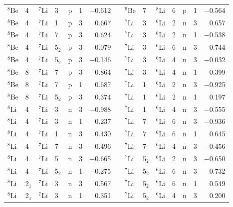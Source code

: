 \documentclass[10pt]{iopart}
\begin{document}
\begin{table}[tp]
\begin{tabular*}{\textwidth}{@{\extracolsep{\fill}}llllllrl@{\extracolsep{\fill}}llllllr@{\extracolsep{\fill}}}
$^8$Be  & 4  & ${}^7$Li   & 3   & p       & 1   & $-$0.612 &  & ${}^9$Be  & 7  & ${}^8$Li    & 6   & p       & 1   & $-$0.564  \\
$^8$Be  & 4  & ${}^7$Li   & 1   & p       & 3   & 0.667  &  & ${}^7$Li  & 3  & ${}^6$Li   & 2   & n       & 3   & 0.657   \\
$^8$Be  & 4  & ${}^7$Li   & 7   & p       & 3   & 0.624  &  & ${}^7$Li  & 3  & ${}^6$Li   & 2   & n       & 1   & $-$0.538  \\
$^8$Be  & 4  & ${}^7$Li   & 5$_2$   & p       & 3   & 0.079  &  & ${}^7$Li  & 3  & ${}^6$Li   & 6   & n       & 3   & 0.744   \\
$^8$Be  & 4  & ${}^7$Li   & 5$_2$   & p       & 3   & $-$0.146 &  & ${}^7$Li  & 3  & ${}^6$Li   & 4   & n       & 3   & $-$0.032  \\
$^8$Be  & 8  & ${}^7$Li   & 7   & p       & 3   & 0.864  &  & ${}^7$Li  & 3  & ${}^6$Li   & 4   & n       & 1   & 0.399   \\
$^8$Be  & 8  & ${}^7$Li   & 7   & p       & 1   & 0.687  &  & ${}^7$Li  & 1  & ${}^6$Li   & 2   & n       & 3   & $-$0.925  \\
$^8$Be  & 8  & ${}^7$Li   & 5$_2$   & p       & 3   & 0.374  &  & ${}^7$Li  & 1  & ${}^6$Li   & 2   & n       & 1   & 0.197   \\
$^8$Li  & 4  & ${}^7$Li   & 3   & n       & 3   & $-$0.988 &  & ${}^7$Li  & 1  & ${}^6$Li   & 4   & n       & 3   & $-$0.555  \\
$^8$Li  & 4  & ${}^7$Li   & 3   & n       & 1   & 0.237  &  & ${}^7$Li  & 7  & ${}^6$Li   & 6   & n       & 3   & $-$0.936  \\
$^8$Li  & 4  & ${}^7$Li   & 1   & n       & 3   & 0.430   &  & ${}^7$Li  & 7  & ${}^6$Li   & 6   & n       & 1   & 0.645   \\
$^8$Li  & 4  & ${}^7$Li   & 7   & n       & 3   & $-$0.496 &  & ${}^7$Li  & 7  & ${}^6$Li   & 4   & n       & 3   & $-$0.456  \\
$^8$Li  & 4  & ${}^7$Li   & 5   & n       & 3   & $-$0.665 &  & ${}^7$Li  & 5$_2$  & ${}^6$Li   & 2   & n       & 3   & $-$0.650   \\
$^8$Li  & 4  & ${}^7$Li   & 5$_2$   & n       & 1   & $-$0.275 &  & ${}^7$Li  & 5$_2$  & ${}^6$Li   & 6   & n       & 3   & 0.732   \\
$^8$Li  & 2$_1$  & ${}^7$Li   & 3   & n       & 3   & 0.567  &  & ${}^7$Li  & 5$_2$  & ${}^6$Li   & 6   & n       & 1   & 0.549   \\
$^8$Li  & 2$_1$  & ${}^7$Li   & 3   & n       & 1   & 0.351  &  & ${}^7$Li  & 5$_2$  & ${}^6$Li   & 4   & n       & 3   & 0.200     \\

\end{tabular*}
\end{table}
\end{document}
